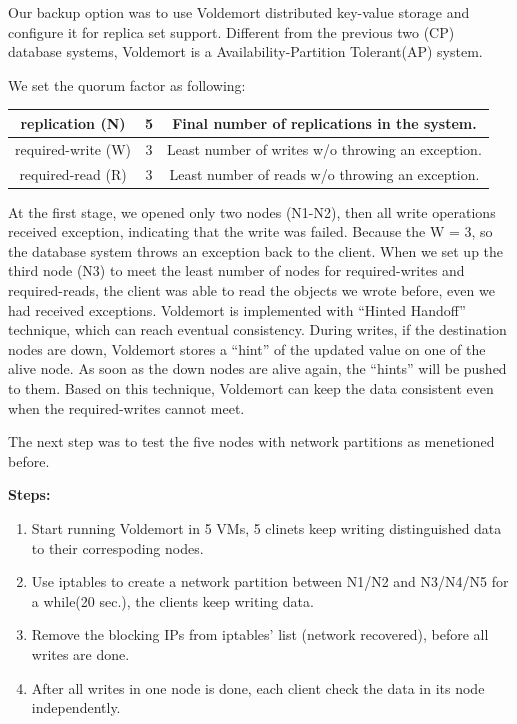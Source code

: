 \documentclass[a4paper]{article}
\begin{document}
Our backup option was to use Voldemort distributed key-value storage and configure it for replica set support. Different from the previous two (CP) database systems, Voldemort is a Availability-Partition Tolerant(AP) system. 

We set the quorum factor as following:

\begin{table}[hb]
  \centering
  \begin{tabular}{|c|c|c|}
    \hline
    replication (N) & 5 & Final number of replications in the system. \\
    \hline
    required-write (W) & 3 & Least number of writes w/o throwing an exception. \\
    \hline
    required-read (R) & 3 & Least number of reads w/o throwing an exception. \\
    \hline
  \end{tabular}
\end{table}

At the first stage, we opened only two nodes (N1-N2), then all write operations received exception, indicating that the write was failed. Because the W = 3, so the database system throws an exception back to the client. When we set up the third node (N3) to meet the least number of nodes for required-writes and required-reads, the client was able to read the objects we wrote before, even we had received exceptions. Voldemort is implemented with ``Hinted Handoff'' technique, which can reach eventual consistency. During writes, if the destination nodes are down, Voldemort stores a ``hint'' of the updated value on one of the alive node. As soon as the down nodes are alive again, the ``hints'' will be pushed to them. Based on this technique, Voldemort can keep the data consistent even when the required-writes cannot meet.

The next step was to test the five nodes with network partitions as menetioned before. 

{\bf Steps:}

\begin{enumerate}
  \item Start running Voldemort in 5 VMs, 5 clinets keep writing distinguished data to their correspoding nodes.
  \item Use iptables to create a network partition between N1/N2 and N3/N4/N5 for a while(20 sec.), the clients keep writing data.
  \item Remove the blocking IPs from iptables' list (network recovered), before all writes are done.
  \item After all writes in one node is done, each client check the data in its node independently.
\end{enumerate}
\end{document}
